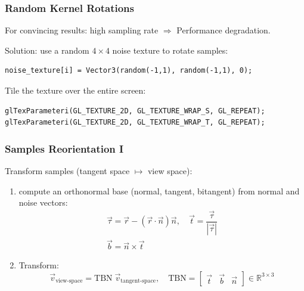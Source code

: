 \documentclass{beamer}
\newcommand{\redtext}[1]{\textcolor{myred}{#1}}
\begin{document}
\begin{frame}[fragile]
\frametitle{Random Kernel Rotations}
For convincing results: \redtext{high sampling rate} $ \Rightarrow $ Performance degradation.

\redtext{Solution}: use a random $ 4\times4 $ noise texture to \redtext{rotate} samples:
\begin{verbatim}
noise_texture[i] = Vector3(random(-1,1), random(-1,1), 0);
\end{verbatim}

\redtext{Tile} the texture over the entire screen:
\begin{verbatim}
glTexParameteri(GL_TEXTURE_2D, GL_TEXTURE_WRAP_S, GL_REPEAT);
glTexParameteri(GL_TEXTURE_2D, GL_TEXTURE_WRAP_T, GL_REPEAT);
\end{verbatim} 

\end{frame}

\begin{frame}
\frametitle{Samples Reorientation I}
Transform samples (\redtext{tangent space $ \mapsto $ view space}):
\begin{enumerate}
    \item compute an orthonormal base (normal, tangent, bitangent) from normal and noise vectors\footnotemark:
    \begin{gather*}
        \vec{\tau} = \vec{r} - (\vec{r} \cdot \vec{n}) \vec{n}, \quad \vec{t} = \dfrac{\vec{\tau}}{|\vec{\tau}|} \\
        \vec{b} = \vec{n} \times \vec{t}
    \end{gather*}
    \item Transform:
    \[
    \vec{v}_{\text{view-space}} = \text{TBN} \; \vec{v}_{\text{tangent-space}}, \quad
    \text{TBN} =
    \begin{bmatrix}
    \vec{t} & \vec{b} & \vec{n}
    \end{bmatrix} \in \mathbb{R}^{3\times3}
    \]
\end{enumerate}

\end{frame}
\end{document}
